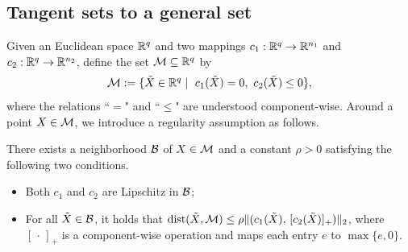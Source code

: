 \subsection{Tangent sets to a general set}\label{sec:generaltengentset}
Given an Euclidean space $\mathbb{R}^q$ and two mappings $c_1:\mathbb{R}^{q}\to\mathbb{R}^{n_1}$ and $c_2:\mathbb{R}^{q}\to\mathbb{R}^{n_2}$, define the set $\mathcal{M}\subseteq\mathbb{R}^q$ by
\[\manifold:=\{\tilde{X}\in\mbR^{q}\mid\ c_1(\tilde{X})=0,\ c_2(\tilde{X})\le 0\},\]
where the relations ``$=$" and ``$\le$" are understood component-wise. Around a point $X\in\mathcal{M}$, we introduce a regularity assumption as follows.

\begin{assumption}\label{assu:errorbound}
There exists a neighborhood $\mathcal{B}$ of $X\in\mathcal{M}$ and a constant $\rho>0$ satisfying the following two conditions.
\begin{itemize}
\item[\emph{(i)}] Both $c_1$ and $c_2$ are Lipschitz in $\mathcal{B}$;
\item[\emph{(ii)}] For all $\tilde X\in \mathcal{B}$, it holds that $\operatorname{dist}(\tilde{X},\mathcal{M})\le\rho\|(c_1(\tilde{X}),\,[c_2(\tilde{X})]_+)\|_2$, where $[\,\cdot\,]_+$ is a component-wise operation and maps each entry $e$ to $\max\{e,0\}$.
\end{itemize}
\end{assumption}


